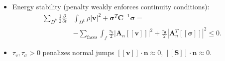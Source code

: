 \documentclass[compress]{beamer}
\newcommand{\pd}[3]{\frac{\partial^{#3} #1}{\partial#2^{#3}}}
\newcommand{\jump}[1] {\ensuremath{\LRs{\![#1]\!}}}
\newcommand{\LRs}[1]{\left[ #1 \right]}
\newcommand{\LRb}[1]{\left| #1 \right|}
\begin{document}
{\begin{itemize}
\begin{overlayarea}{\textwidth}{.32\textheight}
\begin{gather*}
{}
\only<6>{
\text{Sum over all elements: central flux terms cancel } + \\
\sum_k \int_{\partial D^k} \frac{\tau_\sigma}{2}\bm{A}_n\bm{A}_n^T\jump{\bm{\sigma}} \cdot\bm{\sigma} + \frac{\tau_v}{2}\bm{A}_n^T\bm{A}_n\jump{\bm{v}}\cdot\bm{v}
}
\only<7>{
\text{Sum over all elements: combine penalty flux terms} + \\
\sum_k \int_{\partial D^k} \frac{\tau_\sigma}{2}\bm{A}_n^T\jump{\bm{\sigma}}\cdot \bm{A}_n^T\bm{\sigma} + \frac{\tau_v}{2}\bm{A}_n\jump{\bm{v}}\cdot \bm{A}_n\bm{v}
}
\only<8>{
\text{Sum over all elements: combine penalty flux terms} + \\
\sum_k \int_{\partial D^k} \frac{\tau_\sigma}{2}\bm{A}_n^T\jump{\bm{\sigma}} \cdot\bm{A}_n^T\jump{\bm{\sigma}} + \frac{\tau_v}{2}\bm{A}_n\jump{\bm{v}}\cdot\bm{A}_n\jump{\bm{v}}
}
\only<9->{
\text{Sum over all elements: combine penalty flux terms} + \\
\sum_k \int_{\partial D^k} \frac{\tau_\sigma}{2}\bm{A}_n^T\jump{\bm{\sigma}} \cdot\bm{A}_n^T\jump{\bm{\sigma}} + \frac{\tau_v}{2}\bm{A}_n\jump{\bm{v}}\cdot\bm{A}_n\jump{\bm{v}}\\
\text{\ldots and done!}
}
\end{gather*}
\end{overlayarea}
\item Energy stability (penalty weakly enforces continuity conditions):
\begin{align*}
\sum_{D^k} \frac{1}{2}\pd{}{t}{}&\int_{D^k}{\rho \LRb{\bm{v}}^2  + \bm{\sigma}^T\bm{C}^{-1} \bm{\sigma}} =\\
&- \sum_{\text{faces}} \int_{f}{\frac{\tau_{\bm{v}}}{2}\LRb{\bm{A}_n\jump{\bm{v}}}^2 + \frac{\tau_{\bm{\sigma}}}{2}\LRb{\bm{A}_n^T\jump{\bm{\sigma}}}^2} \leq 0.
\end{align*}
\item $\tau_v, \tau_{\sigma} > 0$ penalizes normal jumps ${\jump{\bm{v}}\cdot\bm{n}} \approx 0$, $\jump{\bm{S}}\cdot\bm{n} \approx 0$.
\end{itemize}
}
\end{document}
